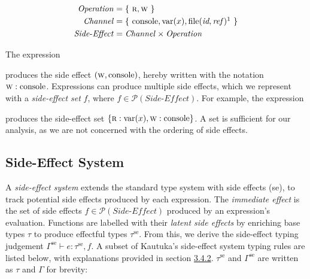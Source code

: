 \begin{align*}
  \mathit{Operation}          & = \{ \ \textsc{r}, \textsc{w} \ \}                                                                  \\
  \mathit{Channel}            & = \{ \ \text{console}, \text{var}(x), \text{file}(\textit{id}, \textit{ref} \,)\footnotemark{} \ \} \\
  \mathit{Side\text{-}Effect} & = \mathit{Channel} \times \mathit{Operation}                                                        \\
\end{align*}

\addtocounter{footnote}{-1}

\vspace{-6mm}

The expression  produces the side effect \( { (\textsc{w}, \text{console}) } \), hereby written with the notation \( { \textsc{w}: \text{console} } \). Expressions can produce multiple side effects, which we represent with a \textit{side-effect set} \( f \), where \( f \in \mathscr{P}(\mathit{Side\text{-}Effect}) \). For example, the expression  produces the side-effect set \( { \{ \textsc{r}: \text{var}(x), \textsc{w}: \text{console} \} } \). A set is sufficient for our analysis, as we are not concerned with the ordering of side effects.

\subsection{Side-Effect System}

\label{sec:2.4.2}

A \textit{side-effect system} extends the standard type system with side effects (\textrm{se}), to track potential side effects produced by each expression. The \textit{immediate effect} is the set of side effects \( { f \in \mathscr{P}(\mathit{Side\text{-}Effect}) } \) produced by an expression's evaluation. Functions are labelled with their \textit{latent side effects} by enriching base types \( \tau \) to produce effectful types \( \tau^\textrm{se} \). From this, we derive the side-effect typing judgement \( \Gamma^\textrm{se} \vdash e : \tau^\textrm{se}, f\). A subset of Kautuka's side-effect system typing rules are listed below, with explanations provided in section \hyperref[sec:3.4.2]{3.4.2}. \( \tau^\textrm{se} \) and \( \Gamma^\textrm{se} \) are written as \( \tau \) and \( \Gamma \) for brevity:

